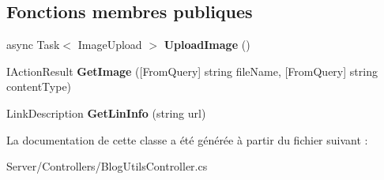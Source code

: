 \subsection*{Fonctions membres publiques}
\begin{DoxyCompactItemize}
\item 
\mbox{\label{class_blazing_blog_1_1_server_1_1_controllers_1_1_blog_utils_controller_a7e2fd0bf2bf61c62ad1598d787987776}} 
async Task$<$ Image\+Upload $>$ {\bfseries Upload\+Image} ()
\item 
\mbox{\label{class_blazing_blog_1_1_server_1_1_controllers_1_1_blog_utils_controller_abd681dd8b9f613ebca29900f87c763b9}} 
I\+Action\+Result {\bfseries Get\+Image} (\mbox{[}From\+Query\mbox{]} string file\+Name, \mbox{[}From\+Query\mbox{]} string content\+Type)
\item 
\mbox{\label{class_blazing_blog_1_1_server_1_1_controllers_1_1_blog_utils_controller_abb07a81ee10a101acbc979c4a217a76a}} 
Link\+Description {\bfseries Get\+Lin\+Info} (string url)
\end{DoxyCompactItemize}


La documentation de cette classe a été générée à partir du fichier suivant \+:\begin{DoxyCompactItemize}
\item 
Server/\+Controllers/Blog\+Utils\+Controller.\+cs\end{DoxyCompactItemize}
